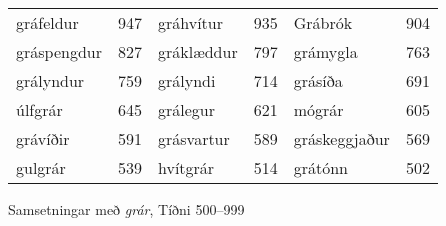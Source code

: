 \documentclass[../samsetningasafn.tex]{subfiles}
\begin{document}
\begin{wordlist}[H]
\begin{tcolorbox}

	\setlength{\extrarowheight}{3pt}
	\begin{tabular}{BlBlBl}
		gráfeldur	& 947		& 	
		gráhvítur	& 935		& 	
		Grábrók		& 904		\\  
		gráspengdur & 827		& 		
		gráklæddur	& 797		& 	
		grámygla	& 763		\\ 	
		grályndur	& 759		& 	
		grályndi		& 714		& 	
		grásíða		& 691		\\ 	
		úlfgrár		& 645		& 		
		grálegur		& 621		& 	
		mógrár		& 605		\\ 	
		grávíðir		& 591		& 	
		grásvartur	& 589		& 	
		gráskeggjaður & 569		\\ 
		gulgrár		& 539		& 		
		hvítgrár		& 514		& 	
		grátónn		& 502				
	\end{tabular}

\end{tcolorbox}
	\caption{Samsetningar með \textit{grár}, Tíðni 500--999}
	\label{listi:gratt.500}
\end{wordlist}	
\end{document}
